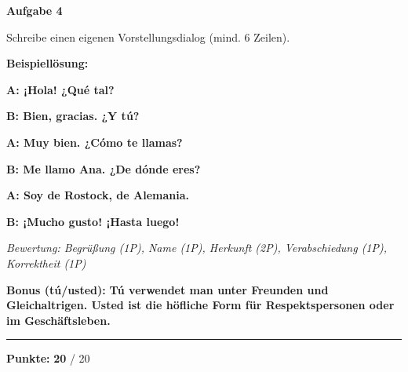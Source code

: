 \documentclass[11pt, a4paper]{article}
\newcommand{\fachfarbe}{spanisch}
\newcommand{\maxpunkte}{20}
\newcommand{\punktebox}[1]{\hfill\fbox{\small \_/#1}}
\newcommand{\loesung}[1]{\textcolor{loesung}{\textbf{#1}}}
\newenvironment{aufgabe}[1]{%
    \vspace{10pt}
    \noindent\textbf{\textcolor{\fachfarbe}{Aufgabe #1}}
    \vspace{5pt}
    \begin{list}{}{\leftmargin=0pt}
    \item[]
}{%
    \end{list}
}
\begin{document}
\begin{aufgabe}{4}
Schreibe einen eigenen Vorstellungsdialog (mind. 6 Zeilen). \punktebox{6}
\end{aufgabe}

\textbf{Beispiellösung:}

\loesung{A: ¡Hola! ¿Qué tal?}

\loesung{B: Bien, gracias. ¿Y tú?}

\loesung{A: Muy bien. ¿Cómo te llamas?}

\loesung{B: Me llamo Ana. ¿De dónde eres?}

\loesung{A: Soy de Rostock, de Alemania.}

\loesung{B: ¡Mucho gusto! ¡Hasta luego!}

\vspace{0.5em}
\textit{\textcolor{grau}{Bewertung: Begrüßung (1P), Name (1P), Herkunft (2P), Verabschiedung (1P), Korrektheit (1P)}}

\vspace{0.5em}
\textbf{Bonus (tú/usted):} \loesung{Tú verwendet man unter Freunden und Gleichaltrigen. Usted ist die höfliche Form für Respektspersonen oder im Geschäftsleben.}

\vspace{20pt}
\hrule
\vspace{10pt}

\begin{flushright}
\textbf{Punkte:} \loesung{\maxpunkte} / \maxpunkte
\end{flushright}
\end{document}
